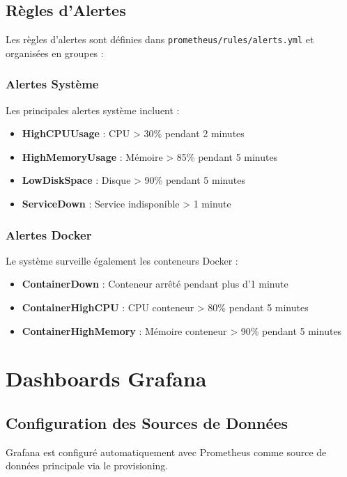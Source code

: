 \documentclass[12pt,a4paper]{report}
\newcommand{\file}[1]{\texttt{\color{secondaryblue}#1}}
\begin{document}
\section{Règles d'Alertes}

Les règles d'alertes sont définies dans \file{prometheus/rules/alerts.yml} et organisées en groupes :

\subsection{Alertes Système}

Les principales alertes système incluent :
\begin{itemize}
    \item \textbf{HighCPUUsage} : CPU > 30\% pendant 2 minutes
    \item \textbf{HighMemoryUsage} : Mémoire > 85\% pendant 5 minutes
    \item \textbf{LowDiskSpace} : Disque > 90\% pendant 5 minutes
    \item \textbf{ServiceDown} : Service indisponible > 1 minute
\end{itemize}

\subsection{Alertes Docker}

Le système surveille également les conteneurs Docker :

\begin{itemize}
    \item \textbf{ContainerDown} : Conteneur arrêté pendant plus d'1 minute
    \item \textbf{ContainerHighCPU} : CPU conteneur > 80\% pendant 5 minutes
    \item \textbf{ContainerHighMemory} : Mémoire conteneur > 90\% pendant 5 minutes
\end{itemize}

\chapter{Dashboards Grafana}

\section{Configuration des Sources de Données}

Grafana est configuré automatiquement avec Prometheus comme source de données principale via le provisioning.
\end{document}
